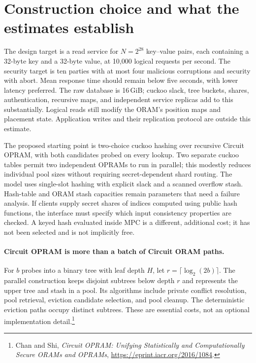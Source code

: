 \section{Construction choice and what the estimates establish}

The design target is a read service for $N=2^{28}$ key--value pairs, each
containing a 32-byte key and a 32-byte value, at 10,000 logical requests per
second. The security target is ten parties with at most four malicious
corruptions and security with abort. Mean response time should remain below
five seconds, with lower latency preferred. The raw database is 16\,GiB;
cuckoo slack, tree buckets, shares, authentication, recursive maps, and
independent service replicas add to this substantially. Logical reads still
modify the ORAM's position maps and placement state. Application writes and
their replication protocol are outside this estimate.

The proposed starting point is two-choice cuckoo hashing over recursive
Circuit OPRAM, with both candidates probed on every lookup. Two separate
cuckoo tables permit two independent OPRAMs to run in parallel; this modestly
reduces individual pool sizes without requiring secret-dependent shard
routing. The model uses single-slot hashing with explicit slack and a scanned
overflow stash. Hash-table and ORAM stash capacities remain parameters that
need a failure analysis. If clients supply secret shares of indices computed
using public hash functions, the interface must specify which input
consistency properties are checked. A keyed hash evaluated inside MPC is a
different, additional cost; it has not been selected and is not implicitly
free.

\paragraph{Circuit OPRAM is more than a batch of Circuit ORAM paths.}
For $b$ probes into a binary tree with leaf depth $H$, let
$r=\lceil\log_2(2b)\rceil$. The parallel construction keeps disjoint subtrees
below depth $r$ and represents the upper tree and stash in a pool. Its
algorithms include private conflict resolution, pool retrieval, eviction
candidate selection, and pool cleanup. The deterministic eviction paths
occupy distinct subtrees. These are essential costs, not an optional
implementation detail.\footnote{Chan and Shi, \emph{Circuit OPRAM: Unifying
Statistically and Computationally Secure ORAMs and OPRAMs},
\url{https://eprint.iacr.org/2016/1084}.}

